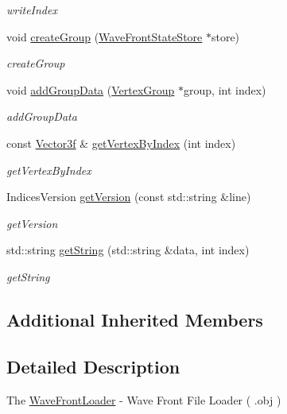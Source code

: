 \begin{DoxyCompactItemize}
\begin{DoxyCompactList}\small\item\em write\+Index \end{DoxyCompactList}\item 
void \hyperlink{classEngine_1_1WaveFrontLoader_a3f0c1139817746f9b2a605a034791424}{create\+Group} (\hyperlink{structEngine_1_1WaveFrontLoader_1_1WFL__StateStore}{Wave\+Front\+State\+Store} $\ast$store)
\begin{DoxyCompactList}\small\item\em create\+Group \end{DoxyCompactList}\item 
void \hyperlink{classEngine_1_1WaveFrontLoader_aff1ab01b494c7b13527dc6845ea40fcf}{add\+Group\+Data} (\hyperlink{classEngine_1_1VertexGroup}{Vertex\+Group} $\ast$group, int index)
\begin{DoxyCompactList}\small\item\em add\+Group\+Data \end{DoxyCompactList}\item 
const \hyperlink{classVector3}{Vector3f} \& \hyperlink{classEngine_1_1WaveFrontLoader_a6d8d035daf23c5878a81523e165a041d}{get\+Vertex\+By\+Index} (int index)
\begin{DoxyCompactList}\small\item\em get\+Vertex\+By\+Index \end{DoxyCompactList}\item 
Indices\+Version \hyperlink{classEngine_1_1WaveFrontLoader_a992b0ee9d5caec0df001219b3289c17e}{get\+Version} (const std\+::string \&line)
\begin{DoxyCompactList}\small\item\em get\+Version \end{DoxyCompactList}\item 
std\+::string \hyperlink{classEngine_1_1WaveFrontLoader_a0fdf66ccfc017383b0260e6e9afcc2f2}{get\+String} (std\+::string \&data, int index)
\begin{DoxyCompactList}\small\item\em get\+String \end{DoxyCompactList}\end{DoxyCompactItemize}
\subsection*{Additional Inherited Members}


\subsection{Detailed Description}
The \hyperlink{classEngine_1_1WaveFrontLoader}{Wave\+Front\+Loader} -\/ Wave Front File Loader ( .obj ) 

